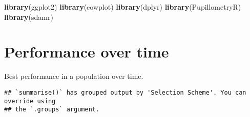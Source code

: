 \documentclass[]{book}
\newenvironment{Shaded}{\begin{snugshade}}{\end{snugshade}}
\newcommand{\CharTok}[1]{\textcolor[rgb]{0.31,0.60,0.02}{#1}}
\newcommand{\CommentTok}[1]{\textcolor[rgb]{0.56,0.35,0.01}{\textit{#1}}}
\newcommand{\DataTypeTok}[1]{\textcolor[rgb]{0.13,0.29,0.53}{#1}}
\newcommand{\KeywordTok}[1]{\textcolor[rgb]{0.13,0.29,0.53}{\textbf{#1}}}
\newcommand{\NormalTok}[1]{#1}
\newcommand{\OperatorTok}[1]{\textcolor[rgb]{0.81,0.36,0.00}{\textbf{#1}}}
\newcommand{\StringTok}[1]{\textcolor[rgb]{0.31,0.60,0.02}{#1}}
\begin{document}
\begin{Shaded}
\begin{Highlighting}[]
\KeywordTok{library}\NormalTok{(ggplot2)}
\KeywordTok{library}\NormalTok{(cowplot)}
\KeywordTok{library}\NormalTok{(dplyr)}
\KeywordTok{library}\NormalTok{(PupillometryR)}
\KeywordTok{library}\NormalTok{(sdamr)}
\end{Highlighting}
\end{Shaded}

\hypertarget{performance-over-time}{%
\section{Performance over time}\label{performance-over-time}}

Best performance in a population over time.

\begin{Shaded}
\end{Shaded}

\begin{verbatim}
## `summarise()` has grouped output by 'Selection Scheme'. You can override using
## the `.groups` argument.
\end{verbatim}
\end{document}
